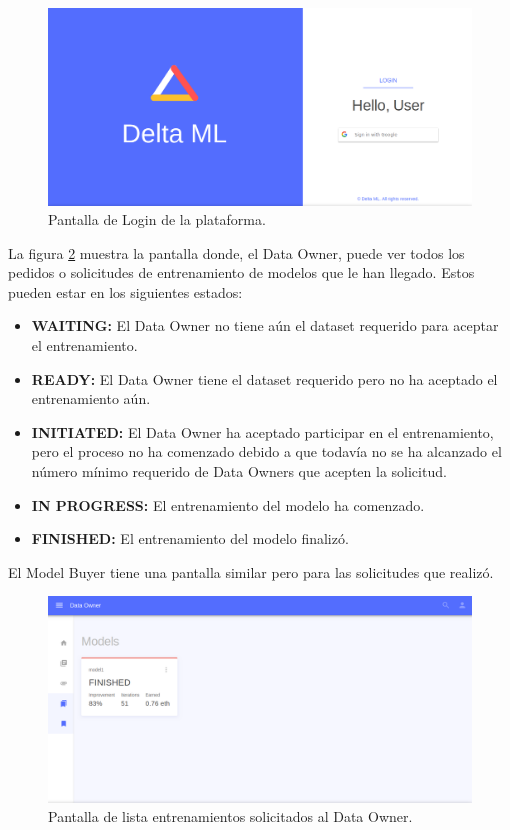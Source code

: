 \documentclass[
11pt, %
oneside, %
spanish, %
singlespacing, %
parskip, %
headsepline, %
chapterinoneline, %
]{MastersDoctoralThesis} %
\begin{document}
\begin{figure}[H]
  	\centering
	\includegraphics[scale=0.3]{imgs/Login.png}
	\caption{Pantalla de Login de la plataforma.}
	\label{fig:login}
\end{figure}

La figura \ref{fig:models_list} muestra la pantalla donde, el Data Owner, puede ver todos los pedidos o solicitudes de entrenamiento de modelos que le han llegado. Estos pueden estar en los siguientes estados:

\begin{itemize}
\item \textbf{WAITING:} El Data Owner no tiene aún el dataset requerido para aceptar el entrenamiento. 
\item \textbf{READY:} El Data Owner tiene el dataset requerido pero no ha aceptado el entrenamiento aún. 
\item \textbf{INITIATED:} El Data Owner ha aceptado participar en el entrenamiento, pero el proceso no ha comenzado debido a que todavía no se ha alcanzado el número mínimo requerido de Data Owners que acepten la solicitud.
\item \textbf{IN PROGRESS:} El entrenamiento del modelo ha comenzado.
\item \textbf{FINISHED:} El entrenamiento del modelo finalizó. 
\end{itemize}

El Model Buyer tiene una pantalla similar pero para las solicitudes que realizó.

\begin{figure}[H]
  	\centering
	\includegraphics[scale=0.3]{imgs/ModelsList.png}
	\caption{Pantalla de lista entrenamientos solicitados al Data Owner.}
	\label{fig:models_list}
\end{figure}
\end{document}
